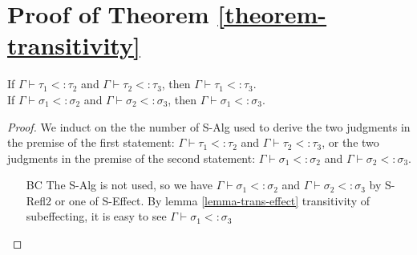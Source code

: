 \section{Proof of Theorem \ref{theorem-transitivity}}
If $\Gamma \vdash \tau_1 <: \tau_2$ and $\Gamma \vdash \tau_2 <: \tau_3$, then $\Gamma \vdash \tau_1 <: \tau_3$. \\
If $\Gamma \vdash \sigma_1 <: \sigma_2$ and $\Gamma \vdash \sigma_2 <: \sigma_3$, then $\Gamma \vdash \sigma_1 <: \sigma_3$. 
\begin{proof}
We induct on the the number of S-Alg used to derive the two judgments in the premise of the first statement: $\Gamma \vdash \tau_1 <: \tau_2$ and $\Gamma \vdash \tau_2 <: \tau_3$, or the two judgments in the premise of the second statement: $\Gamma \vdash \sigma_1 <: \sigma_2$ and $\Gamma \vdash \sigma_2 <: \sigma_3$.
\begin{itemize}
\item[BC] The S-Alg is not used, so we have $\Gamma \vdash \sigma_1 <: \sigma_2$ and $\Gamma \vdash \sigma_2 <: \sigma_3$ by S-Refl2 or one of S-Effect.  By lemma \ref{lemma-trans-effect} transitivity of subeffecting, it is easy to see $\Gamma \vdash \sigma_1 <: \sigma_3$


\end{itemize}
\end{proof}
